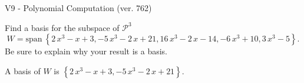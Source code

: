 \begin{exercise}
  \begin{exerciseTitle}V9 - Polynomial Computation (ver. 762)\end{exerciseTitle}
  \begin{exerciseStatement}
    Find a basis for the subspace of \(\mathcal{P}^3\) 
\[W=\mathrm{span}\ \left\{2 \, x^{3} - x + 3 , -5 \, x^{3} - 2 \, x + 21 , 16 \, x^{3} - 2 \, x - 14 , -6 \, x^{3} + 10 , 3 \, x^{3} - 5\right\}.\]
 Be sure to explain why your result is a basis.


  \end{exerciseStatement}
  \begin{exerciseAnswer}
   A basis of \(W\) is  \(\left\{2 \, x^{3} - x + 3 , -5 \, x^{3} - 2 \, x + 21\right\}\).
  


  \end{exerciseAnswer}
\end{exercise}